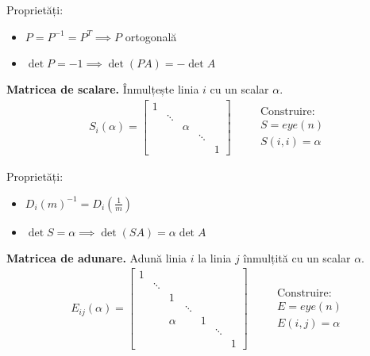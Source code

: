 \documentclass{exam}
\begin{document}
Proprietăți:
\begin{itemize}
	\item $P = P^{-1} = P^T \implies P$ ortogonală
	\item $\det P = -1 \implies \det (PA) = -\det A$
\end{itemize}

\textbf{Matricea de scalare.} Înmulțește linia $i$ cu un scalar $\alpha$.
\begin{equation*}
	\begin{split}
		S_{i}(\alpha) = \begin{bmatrix}
			                1 &        &        &        &   \\
			                  & \ddots &        &        &   \\
			                  &        & \alpha &        &   \\
			                  &        &        & \ddots &   \\
			                  &        &        &        & 1
		                \end{bmatrix}
	\end{split}
	\quad
	\begin{split}
		 & \text{Construire:} \\
		 & S = eye(n)         \\
		 & S (i, i) = \alpha
	\end{split}
\end{equation*}

Proprietăți:
\begin{itemize}
	\item $D_i(m)^{-1} = D_i (\frac{1}{m})$
	\item $\det S = \alpha \implies \det (SA) = \alpha \det A$
\end{itemize}

\textbf{Matricea de adunare.} Adună linia $i$ la linia $j$ înmulțită cu un
scalar $\alpha$.
\begin{equation*}
	\begin{split}
		E_{ij}(\alpha) = \begin{bmatrix}
			                 1 &        &        &        &   &        &   \\
			                   & \ddots &        &        &   &        &   \\
			                   &        & 1      &        &   &        &   \\
			                   &        &        & \ddots &   &        &   \\
			                   &        & \alpha &        & 1 &        &   \\
			                   &        &        &        &   & \ddots &   \\
			                   &        &        &        &   &        & 1
		                 \end{bmatrix}
	\end{split}
	\quad
	\begin{split}
		 & \text{Construire:} \\
		 & E = eye(n)         \\
		 & E (i, j) = \alpha
	\end{split}
\end{equation*}
\end{document}
